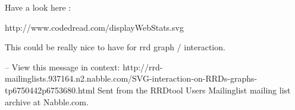 











Have a look here : 

http://www.codedread.com/displayWebStats.svg

This could be really nice to have for rrd graph / interaction.

--
View this message in context: http://rrd-mailinglists.937164.n2.nabble.com/SVG-interaction-on-RRDs-graphs-tp6750442p6753680.html
Sent from the RRDtool Users Mailinglist mailing list archive at Nabble.com.




